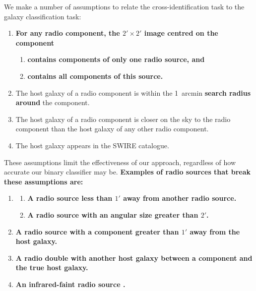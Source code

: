 \documentclass[fleqn,usenatbib,usedcolumn]{mnras}
\newcommand{\edited}[1]{{\bf {#1}}}
\begin{document}
    We make a number of assumptions to relate the cross-identification task to
    the galaxy classification task:
    \begin{enumerate}
      \item \edited{For any radio component, the $2' \times 2'$ image centred on the component} \begin{enumerate}
          \item \edited{contains components of only one radio source, and}
          \item \edited{contains all components of this source.}
        \end{enumerate}
      \item The host galaxy of a radio component is within the 1~arcmin \edited{search radius around} the
        component.
      \item The host galaxy of a radio component is closer on the sky to the
        radio component than the host galaxy of any other radio component.
      \item The host galaxy appears in the SWIRE catalogue.
    \end{enumerate}
    These assumptions limit the effectiveness of our approach, regardless of
    how accurate our binary classifier may be. \edited{Examples of radio sources that break these assumptions are:}
    \begin{enumerate}
      \item \mbox{}
        \begin{enumerate}
          \item \edited{A radio source less than $1'$ away from another radio source.}
          \item \edited{A radio source with an angular size greater than $2'$.}
        \end{enumerate}
      \item \edited{A radio source with a component greater than $1'$ away from the host galaxy.}
      \item \edited{A radio double with another host galaxy between a component and the true host galaxy.}
      \item \edited{An infrared-faint radio source \citep[as in][]{collier14irfaint}.}
    \end{enumerate}
\end{document}
